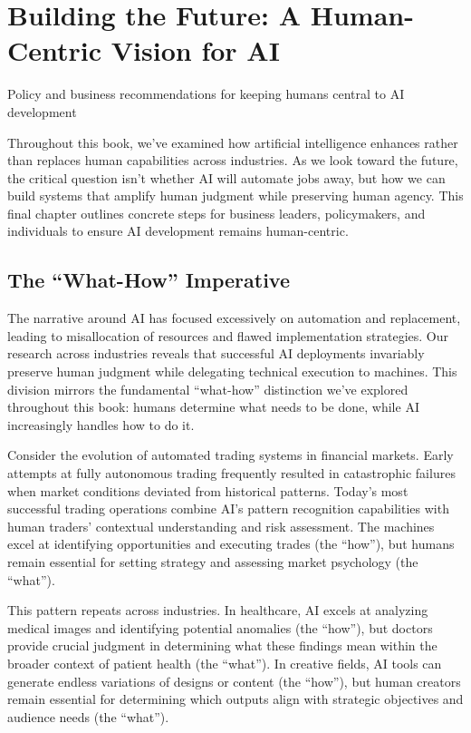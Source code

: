 \documentclass[
  Letterpaper,
]{scrbook}
\begin{document}

\chapter{Building the Future: A Human-Centric Vision for
AI}\label{building-the-future-a-human-centric-vision-for-ai}

Policy and business recommendations for keeping humans central to AI
development

\hfill\break

Throughout this book, we've examined how artificial intelligence
enhances rather than replaces human capabilities across industries. As
we look toward the future, the critical question isn't whether AI will
automate jobs away, but how we can build systems that amplify human
judgment while preserving human agency. This final chapter outlines
concrete steps for business leaders, policymakers, and individuals to
ensure AI development remains human-centric.

\section{The ``What-How'' Imperative}\label{the-what-how-imperative}

The narrative around AI has focused excessively on automation and
replacement, leading to misallocation of resources and flawed
implementation strategies. Our research across industries reveals that
successful AI deployments invariably preserve human judgment while
delegating technical execution to machines. This division mirrors the
fundamental ``what-how'' distinction we've explored throughout this
book: humans determine what needs to be done, while AI increasingly
handles how to do it.

Consider the evolution of automated trading systems in financial
markets. Early attempts at fully autonomous trading frequently resulted
in catastrophic failures when market conditions deviated from historical
patterns. Today's most successful trading operations combine AI's
pattern recognition capabilities with human traders' contextual
understanding and risk assessment. The machines excel at identifying
opportunities and executing trades (the ``how''), but humans remain
essential for setting strategy and assessing market psychology (the
``what'').

This pattern repeats across industries. In healthcare, AI excels at
analyzing medical images and identifying potential anomalies (the
``how''), but doctors provide crucial judgment in determining what these
findings mean within the broader context of patient health (the
``what''). In creative fields, AI tools can generate endless variations
of designs or content (the ``how''), but human creators remain essential
for determining which outputs align with strategic objectives and
audience needs (the ``what'').
\end{document}
